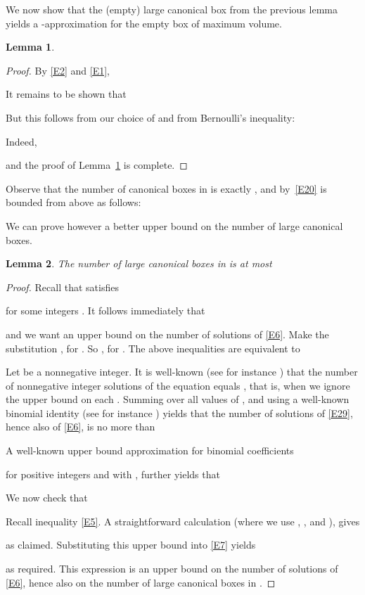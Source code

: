 \documentclass[11pt]{article}
\newtheorem{lemma}{Lemma}
\begin{document}
We now show that the (empty) large canonical box  from the
previous lemma yields a -approximation for the empty box 
of maximum volume. 


\begin{lemma} \label{L9}

\end{lemma}
\begin{proof}
By \eqref{E2} and \eqref{E1}, 

It remains to be shown that 

But this follows from our choice of  and from Bernoulli's
inequality: 

Indeed,

and the proof of Lemma~\ref{L9} is complete.
\end{proof}


Observe that the number of canonical boxes in  is exactly ,
and by~\eqref{E20} is bounded from above as follows:

We can prove however a better upper bound on the number of large canonical
boxes. 

\begin{lemma} \label{L8}
The number of large canonical boxes in  is at most

\end{lemma}
\begin{proof}
Recall that  satisfies

for some integers . 
It follows immediately that
 
and we want an upper bound on the number of solutions of  \eqref{E6}.
Make the substitution , for . 
So , for . 
The above inequalities are equivalent to
 


Let  be a nonnegative integer. It is well-known (see for instance 
\cite{T95}) that the number of
nonnegative integer solutions of the equation  
equals , that is, when we ignore the upper bound
on each . Summing over all values of ,
and using a well-known binomial identity (see for instance 
\cite[p. 217]{T95}) 
yields that the number of solutions of \eqref{E29}, hence also of \eqref{E6},
is no more than

A well-known upper bound approximation for binomial coefficients

for positive integers  and  with , further yields that
 


We now check that 

Recall inequality \eqref{E5}. A straightforward calculation 
(where we use , , and ), gives
 
as claimed. Substituting this upper bound into \eqref{E7} yields
 
as required. This expression is an upper bound on the number of 
solutions of \eqref{E6}, hence also on the number of large canonical
boxes in .  
\end{proof}
\end{document}
